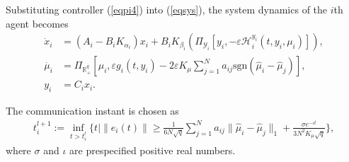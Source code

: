 \documentclass[letterpaper, 10 pt, conference]{ieeeconf}  %
\newcommand{\sign}[1]{\mathrm{sgn}(#1)}
\begin{document}
Substituting controller (\ref{eqpi4}) into (\ref{eqsys}), the system dynamics of the $i$th agent becomes
\begin{subequations}\label{eqpi5}
	\begin{align}
		\dot x_i&=(A_i{-}B_i K_{\alpha_i})x_i+B_iK_{\beta_i}\left(\Pi_{\mathcal{Y}_i}[y_i, -\varepsilon\mathcal{H}_i^{y_i}(t,y_i,\mu_i)]\right),\label{eqpi5a}\\
		\dot{\mu_i}&=\Pi_{\mathbb{R}_+^q}[\mu_i, \varepsilon g_i(t,y_i) {-}2\varepsilon K_\mu \!\sum_{j=1}^N a_{ij}\sign{\hat\mu_i-\hat\mu_j}], \label{eqpi5b}\\
		y_i&=C_ix_i.\label{eqpi5c}
	\end{align}
\end{subequations}


The communication instant is chosen as
\begin{align}
	t_i^{l+1}\!:=\!\inf_{t>t_i^l}\!\Big\{t\Big|\|e_i(t)\|{\ge}\frac{1}{6N\!\sqrt{q}}\!\sum_{j=1}^N \!a_{ij} \!\|\hat\mu_i{-}\hat\mu_j\|_{\!1} {+} \frac{\sigma e^{-\iota t}}{3N^{\!2}\!K_{\!\mu}\!\sqrt{q}}\Big\},\label{tau2}
\end{align}
where $\sigma$ and $\iota$ are prespecified positive real numbers. 
\end{document}
